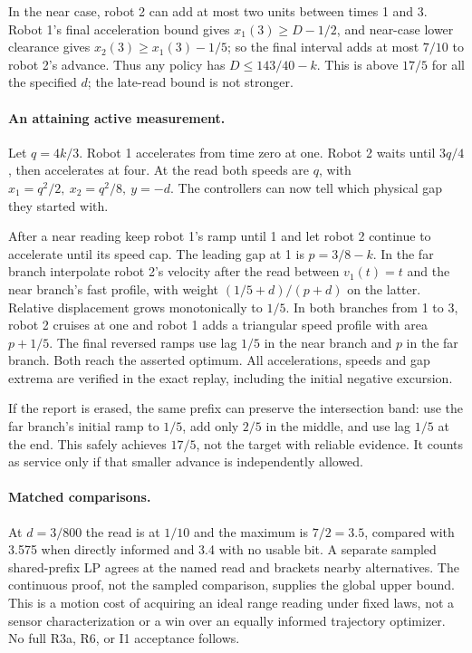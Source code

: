 \documentclass[11pt]{article}
\begin{document}
In the near case, robot 2 can add at most two units between
times 1 and 3. Robot 1's final acceleration bound gives
\(x_1(3)\ge D-1/2\), and near-case lower clearance gives
\(x_2(3)\ge x_1(3)-1/5\); so the final interval adds at most
\(7/10\) to robot 2's advance. Thus any policy has
\(D\le143/40-k\). This is above \(17/5\) for all the
specified \(d\); the late-read bound is not stronger.

\paragraph{An attaining active measurement.}
Let \(q=4k/3\). Robot 1 accelerates from time zero at one.
Robot 2 waits until \(3q/4\), then accelerates at four.
At the read both speeds are \(q\), with
\(x_1=q^2/2,\ x_2=q^2/8,\ y=-d\).
The controllers can now tell which physical gap they started with.

After a near reading keep robot 1's ramp until 1 and let robot 2
continue to accelerate until its speed cap. The leading gap at
1 is \(p=3/8-k\). In the far branch interpolate robot 2's
velocity after the read between \(v_1(t)=t\) and the near branch's
fast profile, with weight \((1/5+d)/(p+d)\) on the latter.
Relative displacement grows monotonically to \(1/5\). In both
branches from 1 to 3, robot 2 cruises at one and robot 1 adds
a triangular speed profile with area \(p+1/5\).
The final reversed ramps use lag \(1/5\) in the near branch
and \(p\) in the far branch. Both reach the asserted optimum.
All accelerations, speeds and gap extrema are verified in
the exact replay, including the initial negative excursion.

If the report is erased, the same prefix can preserve the
intersection band: use the far branch's initial ramp to \(1/5\),
add only \(2/5\) in the middle, and use lag \(1/5\) at the end.
This safely achieves \(17/5\), not the target with reliable
evidence. It counts as service only if that smaller advance
is independently allowed.

\paragraph{Matched comparisons.}
At \(d=3/800\) the read is at \(1/10\) and the maximum is
\(7/2=3.5\), compared with 3.575 when directly informed and
3.4 with no usable bit. A separate sampled shared-prefix LP
agrees at the named read and brackets nearby alternatives.
The continuous proof, not the sampled comparison, supplies the
global upper bound. This is a motion cost of acquiring an ideal
range reading under fixed laws, not a sensor characterization or
a win over an equally informed trajectory optimizer. No full
R3a, R6, or I1 acceptance follows.
\end{document}
